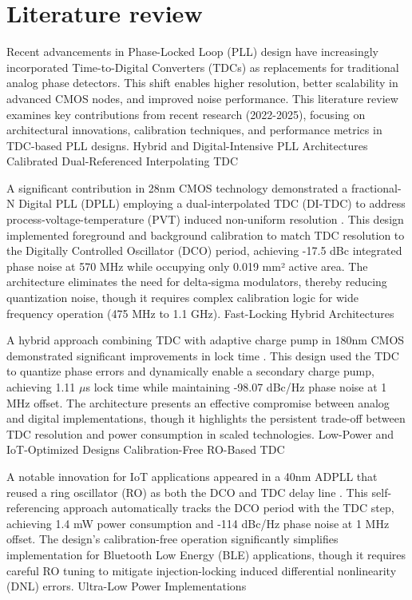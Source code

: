 
\chapter{Literature review}
Recent advancements in Phase-Locked Loop (PLL) design have increasingly incorporated Time-to-Digital Converters (TDCs) as replacements for traditional analog phase detectors. This shift enables higher resolution, better scalability in advanced CMOS nodes, and improved noise performance. This literature review examines key contributions from recent research (2022-2025), focusing on architectural innovations, calibration techniques, and performance metrics in TDC-based PLL designs.
Hybrid and Digital-Intensive PLL Architectures
Calibrated Dual-Referenced Interpolating TDC

A significant contribution in 28nm CMOS technology demonstrated a fractional-N Digital PLL (DPLL) employing a dual-interpolated TDC (DI-TDC) to address process-voltage-temperature (PVT) induced non-uniform resolution \cite{di_tdc_2023}. This design implemented foreground and background calibration to match TDC resolution to the Digitally Controlled Oscillator (DCO) period, achieving -17.5 dBc integrated phase noise at 570 MHz while occupying only 0.019 mm² active area. The architecture eliminates the need for delta-sigma modulators, thereby reducing quantization noise, though it requires complex calibration logic for wide frequency operation (475 MHz to 1.1 GHz).
Fast-Locking Hybrid Architectures

A hybrid approach combining TDC with adaptive charge pump in 180nm CMOS demonstrated significant improvements in lock time \cite{hybrid_pll_2022}. This design used the TDC to quantize phase errors and dynamically enable a secondary charge pump, achieving 1.11 $\mu$s lock time while maintaining -98.07 dBc/Hz phase noise at 1 MHz offset. The architecture presents an effective compromise between analog and digital implementations, though it highlights the persistent trade-off between TDC resolution and power consumption in scaled technologies.
Low-Power and IoT-Optimized Designs
Calibration-Free RO-Based TDC

A notable innovation for IoT applications appeared in a 40nm ADPLL that reused a ring oscillator (RO) as both the DCO and TDC delay line \cite{ro_tdc_2023}. This self-referencing approach automatically tracks the DCO period with the TDC step, achieving 1.4 mW power consumption and -114 dBc/Hz phase noise at 1 MHz offset. The design's calibration-free operation significantly simplifies implementation for Bluetooth Low Energy (BLE) applications, though it requires careful RO tuning to mitigate injection-locking induced differential nonlinearity (DNL) errors.
Ultra-Low Power Implementations

